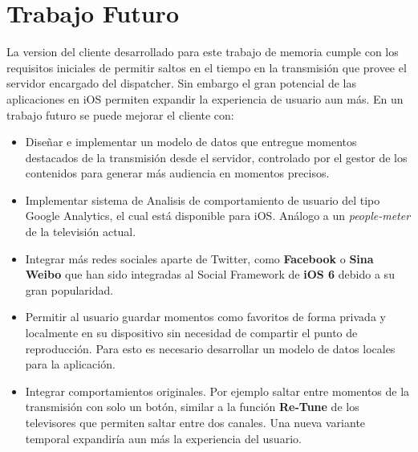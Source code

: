 	\section{Trabajo Futuro}
La version del cliente desarrollado para este trabajo de memoria cumple con los requisitos iniciales de permitir saltos en el tiempo en la transmisión que provee el servidor encargado del dispatcher. Sin embargo el gran potencial de las aplicaciones en iOS permiten expandir la experiencia de usuario aun más. En un trabajo futuro se puede mejorar el cliente con:
\begin{itemize}
\item Diseñar e implementar un modelo de datos que entregue momentos destacados de la transmisión desde el servidor, controlado por el gestor de los contenidos para generar más audiencia en momentos precisos.

\item Implementar sistema de Analisis de comportamiento de usuario del tipo Google Analytics, el cual está disponible para iOS. Análogo a un \textit{people-meter} de la televisión actual.

\item Integrar más redes sociales aparte de Twitter, como \textbf{Facebook} o \textbf{Sina Weibo} que han sido integradas al Social Framework de \textbf{iOS 6} debido a su gran popularidad.

\item Permitir al usuario guardar momentos como favoritos de forma privada y localmente en su dispositivo sin necesidad de compartir el punto de reproducción. Para esto es necesario desarrollar un modelo de datos locales para la aplicación.

\item Integrar comportamientos originales. Por ejemplo saltar entre momentos de la transmisión con solo un botón, similar a la función \textbf{Re-Tune} de los televisores que permiten saltar entre dos canales. Una nueva variante temporal expandiría aun más la experiencia del usuario.
\end{itemize}

	

